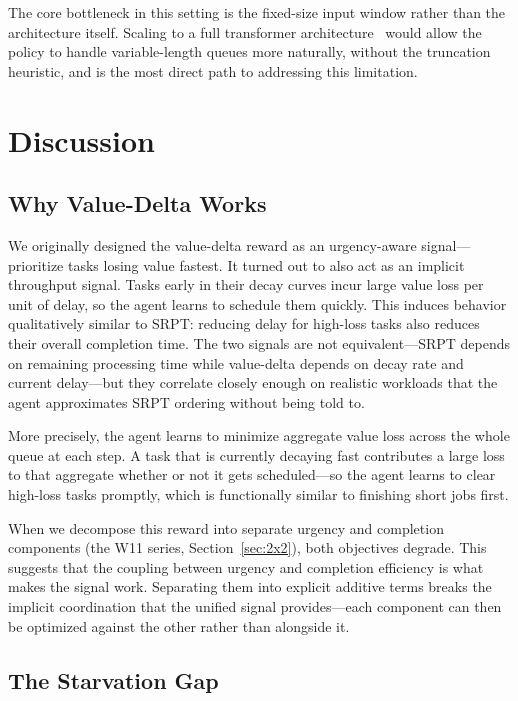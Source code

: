\documentclass[10pt,twocolumn]{article}
\theoremstyle{remark}
\begin{document}
The core bottleneck in this setting is the fixed-size input window
rather than the architecture itself. Scaling to a full transformer
architecture~\cite{vaswani2017} would allow the policy to handle
variable-length queues more naturally, without the truncation
heuristic, and is the most direct path to addressing this limitation.

\section{Discussion}

\subsection{Why Value-Delta Works}

We originally designed the value-delta reward as an urgency-aware
signal---prioritize tasks losing value fastest. It turned out to also
act as an implicit throughput signal. Tasks early in their decay
curves incur large value loss per unit of delay, so the agent learns
to schedule them quickly. This induces behavior qualitatively similar
to SRPT: reducing delay for high-loss tasks also reduces their
overall completion time. The two signals are not equivalent---SRPT
depends on remaining processing time while value-delta depends on
decay rate and current delay---but they correlate closely enough on
realistic workloads that the agent approximates SRPT ordering without
being told to.

More precisely, the agent learns to minimize aggregate value loss
across the whole queue at each step. A task that is currently
decaying fast contributes a large loss to that aggregate whether or
not it gets scheduled---so the agent learns to clear high-loss tasks
promptly, which is functionally similar to finishing short jobs first.

When we decompose this reward into separate urgency and completion
components (the W11 series, Section~\ref{sec:2x2}), both objectives
degrade. This suggests that the coupling between urgency and
completion efficiency is what makes the signal work. Separating them
into explicit additive terms breaks the implicit coordination that
the unified signal provides---each component can then be optimized
against the other rather than alongside it.

\subsection{The Starvation Gap}
\end{document}
